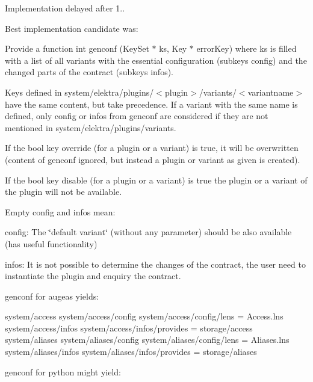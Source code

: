 Implementation delayed after 1..

Best implementation candidate was\+:


\begin{DoxyEnumerate}
\item Provide a function {\ttfamily int genconf (Key\+Set $\ast$ ks, Key $\ast$ error\+Key)} where {\ttfamily ks} is filled with a list of all variants with the essential configuration (subkeys {\ttfamily config}) and the changed parts of the contract (subkeys {\ttfamily infos}).
\item Keys defined in {\ttfamily system/elektra/plugins/$<$plugin$>$/variants/$<$variantname$>$} have the same content, but take precedence. If a variant with the same name is defined, only {\ttfamily config} or {\ttfamily infos} from {\ttfamily genconf} are considered if they are not mentioned in {\ttfamily system/elektra/plugins/variants}.
\item If the bool key {\ttfamily override} (for a plugin or a variant) is true, it will be overwritten (content of {\ttfamily genconf} ignored, but instead a plugin or variant as given is created).
\item If the bool key {\ttfamily disable} (for a plugin or a variant) is true the plugin or a variant of the plugin will not be available.
\item Empty {\ttfamily config} and {\ttfamily infos} mean\+:
\begin{DoxyItemize}
\item {\ttfamily config}\+: The \char`\"{}default variant\char`\"{} (without any parameter) should be also available (has useful functionality)
\item {\ttfamily infos}\+: It is not possible to determine the changes of the contract, the user need to instantiate the plugin and enquiry the contract.
\end{DoxyItemize}
\end{DoxyEnumerate}

{\ttfamily genconf} for augeas yields\+:


\begin{DoxyCode}
system/access
system/access/config
system/access/config/lens = Access.lns
system/access/infos
system/access/infos/provides = storage/access
system/aliases
system/aliases/config
system/aliases/config/lens = Aliases.lns
system/aliases/infos
system/aliases/infos/provides = storage/aliases
\end{DoxyCode}


{\ttfamily genconf} for python might yield\+:


